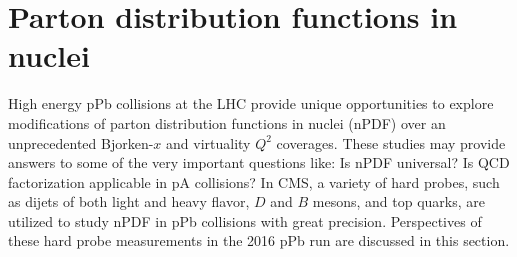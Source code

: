 \section{Parton distribution functions in nuclei}

High energy pPb collisions at the LHC provide unique opportunities
to explore modifications of parton distribution functions
in nuclei (nPDF) over an unprecedented Bjorken-$x$ and 
virtuality $Q^{2}$ coverages. These studies may provide
answers to some of the very important questions like: Is nPDF universal? 
Is QCD factorization applicable in pA collisions?
In CMS, a variety of hard probes, such 
as dijets of both light and heavy flavor, $D$ and $B$ mesons, and
top quarks, are utilized to study nPDF in pPb collisions with 
great precision. Perspectives of these hard probe measurements 
in the 2016 pPb run are discussed in this section.